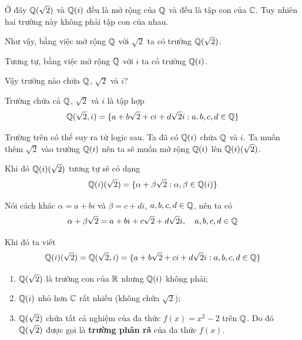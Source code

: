 Ở đây $\mathbb{Q}(\sqrt{2})$ và $\mathbb{Q}(i)$ đều là mở rộng của $\mathbb{Q}$ và đều là tập con của $\mathbb{C}$. Tuy nhiên hai trường này không phải tập con của nhau.

Như vậy, bằng việc mở rộng $\mathbb{Q}$ với $\sqrt{2}$ ta có trường $\mathbb{Q}(\sqrt{2})$.

Tương tự, bằng việc mở rộng $\mathbb{Q}$ với $i$ ta có trường $\mathbb{Q}(i)$.

Vậy trường nào chứa $\mathbb{Q}$, $\sqrt{2}$ và $i$?

\begin{example}
    Trường chứa cả $\mathbb{Q}$, $\sqrt{2}$ và $i$ là tập hợp
    \begin{equation*}
        \mathbb{Q}(\sqrt{2}, i) = \{ a + b\sqrt{2} + c i + d \sqrt{2} i : a, b, c, d \in \mathbb{Q} \}
    \end{equation*}
\end{example}

Trường trên có thể suy ra từ logic sau. Ta đã có $\mathbb{Q}(i)$ chứa $\mathbb{Q}$ và $i$. Ta muốn thêm $\sqrt{2}$ vào trường $\mathbb{Q}(i)$ nên ta sẽ muốn mở rộng $\mathbb{Q}(i)$ lên $\mathbb{Q}(i)(\sqrt{2})$.

Khi đó $\mathbb{Q}(i)(\sqrt{2})$ tương tự sẽ có dạng
\begin{equation*}
    \mathbb{Q}(i)(\sqrt{2}) = \{ \alpha + \beta \sqrt{2} : \alpha, \beta \in \mathbb{Q}(i) \}
\end{equation*}

Nói cách khác $\alpha = a + b i$ và $\beta = c + d i$, $a, b, c, d \in \mathbb{Q}$, nên ta có
\begin{equation*}
    \alpha + \beta \sqrt{2} = a + b i + c \sqrt{2} + d \sqrt{2} i, \quad a, b, c, d \in \mathbb{Q}
\end{equation*}

Khi đó ta viết
\begin{equation*}
    \mathbb{Q}(i)(\sqrt{2}) = \mathbb{Q}(\sqrt{2}, i) = \{ a + b\sqrt{2} + c i + d \sqrt{2} i : a, b, c, d \in \mathbb{Q} \}
\end{equation*}

\begin{remark}
    \begin{enumerate}
        \item $\mathbb{Q}(\sqrt{2})$ là trường con của $\mathbb{R}$ nhưng $\mathbb{Q}(i)$ không phải;
        \item $\mathbb{Q}(i)$ nhỏ hơn $\mathbb{C}$ rất nhiều (không chứa $\sqrt{2}$);
        \item $\mathbb{Q}(\sqrt{2})$ chứa tất cả nghiệm của đa thức $f(x) = x^2 - 2$ trên $\mathbb{Q}$. Do đó $\mathbb{Q}(\sqrt{2})$ được gọi là \textbf{trường phân rã} của đa thức $f(x)$.
    \end{enumerate}
\end{remark}

